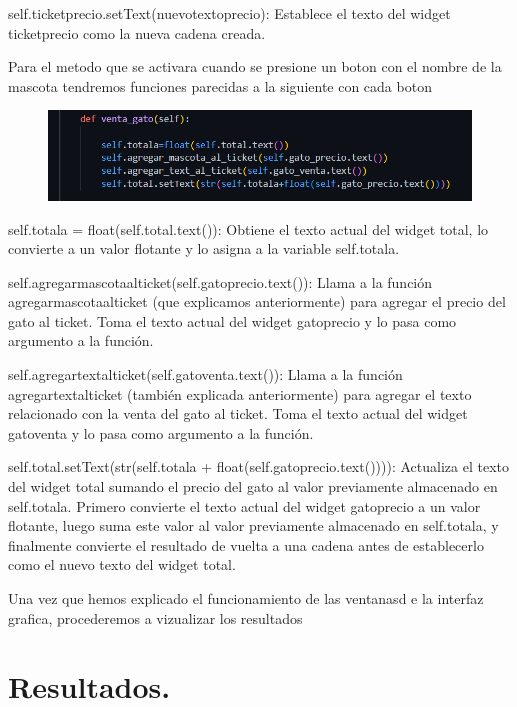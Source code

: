 \documentclass[11pt]{article}
\begin{document}
self.ticketprecio.setText(nuevotextoprecio): Establece el texto del widget ticketprecio como la nueva cadena creada.

Para el metodo que se activara cuando se presione un boton con el nombre de la mascota tendremos funciones parecidas a la siguiente con cada boton

\begin{figure}[H]
		\begin{center}
 			\includegraphics[width = .6\textwidth]{12.png}
 			
		\end{center} 
\end{figure}

self.totala = float(self.total.text()): Obtiene el texto actual del widget total, lo convierte a un valor flotante y lo asigna a la variable self.totala.

self.agregarmascotaalticket(self.gatoprecio.text()): Llama a la función agregarmascotaalticket (que explicamos anteriormente) para agregar el precio del gato al ticket. Toma el texto actual del widget gatoprecio  y lo pasa como argumento a la función.

self.agregartextalticket(self.gatoventa.text()): Llama a la función agregartextalticket (también explicada anteriormente) para agregar el texto relacionado con la venta del gato al ticket. Toma el texto actual del widget gatoventa y lo pasa como argumento a la función.

self.total.setText(str(self.totala + float(self.gatoprecio.text()))): Actualiza el texto del widget total sumando el precio del gato al valor previamente almacenado en self.totala. Primero convierte el texto actual del widget gatoprecio a un valor flotante, luego suma este valor al valor previamente almacenado en self.totala, y finalmente convierte el resultado de vuelta a una cadena antes de establecerlo como el nuevo texto del widget total.

Una vez que hemos explicado el funcionamiento de las ventanasd e la interfaz grafica, procederemos a vizualizar los resultados

\section{Resultados.}
\end{document}
